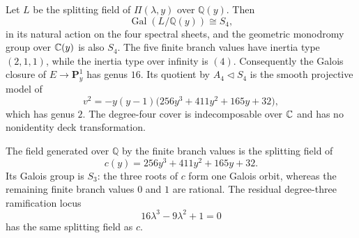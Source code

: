 \begin{theorem}
\label{thm:canonical-monodromy}
Let $L$ be the splitting field of $\Pi(\lambda,y)$ over $\mathbb Q(y)$.  Then
\[
\operatorname{Gal}(L/\mathbb Q(y))\cong S_4,
\]
in its natural action on the four spectral sheets, and the geometric
monodromy group over $\mathbb{C}(y)$ is also $S_4$.  The five finite branch values
have inertia type $(2,1,1)$, while the inertia type over infinity is $(4)$.
Consequently the Galois closure of $E\to\mathbf P^1_y$ has genus $16$.
Its quotient by $A_4\triangleleft S_4$ is the smooth projective model of
\begin{equation}\label{eq:canonical-discriminant-quotient}
v^2=-y(y-1)\bigl(256y^3+411y^2+165y+32\bigr),
\end{equation}
which has genus $2$.
The degree-four cover is indecomposable over $\mathbb{C}$ and has no nonidentity
deck transformation.

The field generated over $\mathbb Q$ by the finite branch values is the splitting
field of
\[
c(y)=256y^3+411y^2+165y+32.
\]
Its Galois group is $S_3$: the three roots of $c$ form one Galois orbit,
whereas the remaining finite branch values $0$ and $1$ are rational.
The residual degree-three ramification locus
\[
16\lambda^3-9\lambda^2+1=0
\]
has the same splitting field as $c$.
\end{theorem}

